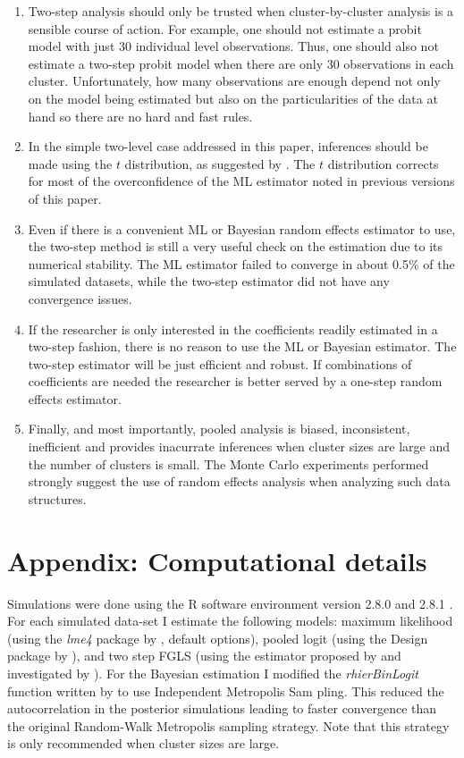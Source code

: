 \begin{enumerate}
\item Two-step analysis should only be trusted when cluster-by-cluster analysis is a sensible course of action. For example, one should not estimate a probit model with just 30 individual level observations. Thus, one should also not estimate a two-step probit model when there are only 30 observations in each cluster. Unfortunately, how many observations are enough depend not only on the model being estimated but also on the particularities of the data at hand so there are no hard and fast rules.
\item In the simple two-level case addressed in this paper, inferences should be made using the $t$ distribution, as suggested by \citet{donald:2007}. The $t$ distribution corrects for most of the overconfidence of the  ML  estimator noted in previous versions of this paper.
\item Even if there is a convenient ML or Bayesian random effects estimator to use, the two-step method is still a very useful check on the estimation due to its numerical stability. The ML estimator failed to converge in about 0.5\% of the simulated datasets, while the two-step estimator did not have any convergence issues.
\item If the researcher is only interested in the coefficients readily estimated in a two-step fashion, there is no  reason to use the ML or Bayesian estimator. The two-step estimator will be just efficient and robust. If combinations of coefficients are needed the researcher is better served by a one-step random effects estimator.
\item Finally, and most importantly, pooled analysis is biased, inconsistent, inefficient and provides inacurrate inferences when cluster sizes are large and the number of clusters is small. The Monte Carlo experiments performed  strongly suggest  the use of random effects analysis when analyzing such data structures.
\end{enumerate}


\section*{Appendix: Computational details}

Simulations were done using the R software environment version 2.8.0 and 2.8.1 \citep{R-Development-Core-Team:2008}. For each simulated data-set I estimate the following models: maximum likelihood (using the \emph{lme4} package by \citeauthor{bates:2003}, default options), pooled logit (using the Design package by \citeauthor{harrell:2008}),  and two step FGLS (using the estimator proposed by \citeauthor{hanushek:1974} and investigated by \citeauthor{lewis:2005}). For the Bayesian estimation I   modified the  \emph{rhierBinLogit} function written by \citet{rossi:2006} to use Independent Metropolis Sam
pling. This  reduced the autocorrelation in the posterior simulations leading to faster convergence than the original Random-Walk Metropolis sampling strategy.   Note that this strategy is only recommended when cluster sizes are large.

